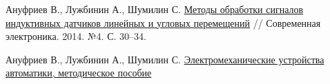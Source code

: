 \newpage
{} %


\begin{thebibliography}{9}
    Ануфриев В., Лужбинин А., Шумилин С. 
    \href{https://www.milandr.ru/upload/iblock/4bf/4bf1c97fcce296a450d7b68bb0fc65b0.pdf}{Методы обработки сигналов индуктивных датчиков линейных и угловых перемещений} // Современная электроника. 2014. №4. С. 30–34.

    Ануфриев В., Лужбинин А., Шумилин С. 
    \href{https://servomotors.ru/documentation/electromechanical_automation_devices/book/about.html}{Электромеханические устройства автоматики, методическое пособие} 


\end{thebibliography} 
